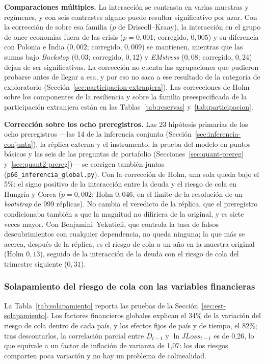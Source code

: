 \textbf{Comparaciones múltiples.} La interacción se contrasta en varias muestras y regímenes, y con seis contrastes alguno puede resultar significativo por azar. Con la corrección de \citet{Holm1979} sobre esa familia ($p$ de Driscoll--Kraay), la interacción en el grupo de once economías fuera de las crisis ($p=0{,}001$; corregido, $0{,}005$) y su diferencia con Polonia e India ($0{,}002$; corregido, $0{,}009$) se mantienen, mientras que las sumas bajo \textit{Backstop} ($0{,}03$; corregido, $0{,}12$) y \textit{EMstress} ($0{,}08$; corregido, $0{,}24$) dejan de ser significativas. La corrección no cuenta las agrupaciones que pudieron probarse antes de llegar a esa, y por eso no saca a ese resultado de la categoría de exploratorio (Sección~\ref{sec:participacion-extranjera}). Las correcciones de Holm sobre los componentes de la resiliencia y sobre la familia preespecificada de la participación extranjera están en las Tablas~\ref{tab:reservas} y~\ref{tab:participacion}.

\textbf{Corrección sobre los ocho preregistros.} Las 23 hipótesis primarias de los ocho preregistros ---las 14 de la inferencia conjunta (Sección~\ref{sec:inferencia-conjunta}), la réplica externa y el instrumento, la prueba del modelo en puntos básicos y las seis de las preguntas de portafolio (Secciones~\ref{sec:quant-prereg} y~\ref{sec:quant2-prereg})--- se corrigen también juntas (\texttt{p66\_inferencia\_global.py}). Con la corrección de Holm, una sola queda bajo el 5\%: el signo positivo de la interacción entre la deuda y el riesgo de cola en Hungría y Corea ($p=0{,}002$; Holm $0{,}046$, en el límite de la resolución de un \textit{bootstrap} de 999 réplicas). No cambia el veredicto de la réplica, que el preregistro condicionaba también a que la magnitud no difiriera de la original, y es siete veces mayor. Con Benjamini--Yekutieli, que controla la tasa de falsos descubrimientos con cualquier dependencia, no queda ninguna; la que más se acerca, después de la réplica, es el riesgo de cola a un año en la muestra original (Holm $0{,}13$), seguido de la interacción de la deuda con el riesgo de cola del trimestre siguiente ($0{,}31$).

\subsubsection{Solapamiento del riesgo de cola con las variables financieras}
\label{sec:robustez-solapamiento}

La Tabla~\ref{tab:solapamiento} reporta las pruebas de la Sección~\ref{sec:est-solapamiento}. Los factores financieros globales explican el 34\% de la variación del riesgo de cola dentro de cada país, y los efectos fijos de país y de tiempo, el 82\%; tras descontarlos, la correlación parcial entre $D_{t-1}$ y $\ln JLoss_{t-1}$ es de 0,26, lo que equivale a un factor de inflación de varianza de 1,07: los dos riesgos comparten poca variación y no hay un problema de colinealidad.

